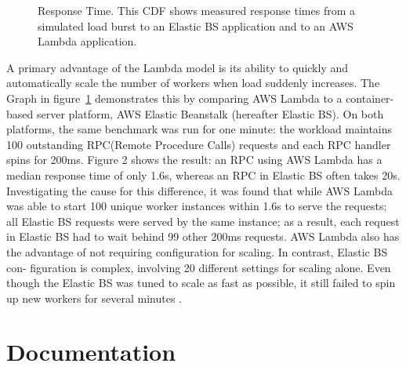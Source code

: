 \documentclass[9pt,twocolumn,twoside]{../../styles/osajnl}
\begin{document}
\begin{figure}[H]
\centering
\graphicspath{ {images/} }
\caption{Response Time. This CDF shows measured
response times from a simulated load burst to an Elastic BS
application and to an AWS Lambda application.}  \cite{OpenLambda}
\label{fig:scale}
\end{figure}

A primary advantage of the Lambda model is its ability
to quickly and automatically scale the number of workers
when load suddenly increases. The Graph in figure~\ref{fig:scale} demonstrates this by 
comparing AWS Lambda to a container-based server platform,
AWS Elastic Beanstalk \cite{www-AWSEBS} (hereafter Elastic BS).
On both platforms, the same benchmark was run for one
minute: the workload maintains 100 outstanding RPC(Remote Procedure Calls)
requests and each RPC handler spins for 200ms.
Figure 2 shows the result: an RPC using AWS Lambda
has a median response time of only 1.6s, whereas an RPC
in Elastic BS often takes 20s. Investigating the cause for
this difference, it was found that while AWS Lambda was
able to start 100 unique worker instances within 1.6s to
serve the requests; all Elastic BS requests were served by
the same instance; as a result, each request in Elastic BS
had to wait behind 99 other 200ms requests.
AWS Lambda also has the advantage of not requiring
configuration for scaling. In contrast, Elastic BS con-
figuration is complex, involving 20 different settings for
scaling alone. Even though the Elastic BS was tuned to scale
as fast as possible, it still
failed to spin up new workers for several minutes  \cite{OpenLambda}.

\section{Documentation}
\end{document}
